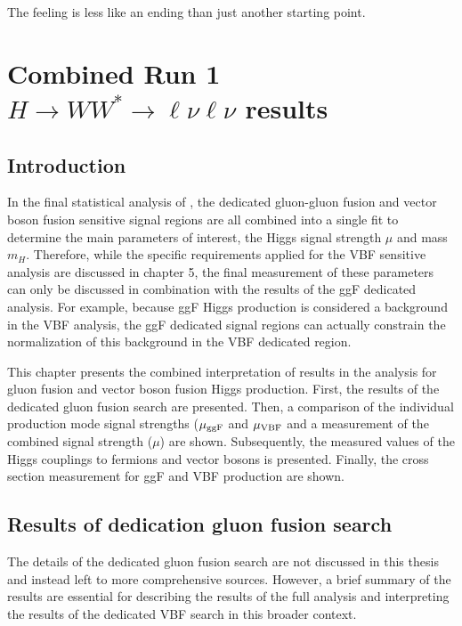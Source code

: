 \begin{savequote}[75mm]
The feeling is less like an ending than just another starting point.
\end{savequote}

\chapter{Combined Run 1 $H\rightarrow WW^{*}\rightarrow \ell\nu\ell\nu$ results}

\section{Introduction}

In the final statistical analysis of \HWWfull, the dedicated gluon-gluon fusion and vector boson fusion sensitive signal regions are all combined into a single fit to determine the main parameters of interest, the Higgs signal strength $\mu$ and mass $m_H$. Therefore, while the specific requirements applied for the VBF sensitive analysis are discussed in chapter 5, the final measurement of these parameters can only be discussed in combination with the results of the ggF dedicated analysis. For example, because ggF Higgs production is considered a background in the VBF analysis, the ggF dedicated signal regions can actually constrain the normalization of this background in the VBF dedicated region.

This chapter presents the combined interpretation of results in the \HWWfull analysis for gluon fusion and vector boson fusion Higgs production. First, the results of the dedicated gluon fusion search are presented. Then, a comparison of the individual production mode signal strengths ($\mu_{{\rm ggF}}$ and $\mu_{{\rm VBF}}$ and a measurement of the combined signal strength ($\mu$) are shown. Subsequently, the measured values of the Higgs couplings to fermions and vector bosons is presented. Finally, the cross section measurement for ggF and VBF production are shown. 

\section{Results of dedication gluon fusion \HWWfull search}

The details of the dedicated gluon fusion \HWWfull search are not discussed in this thesis and instead left to more comprehensive sources\cite{WW2015}. However, a brief summary of the results are essential for describing the results of the full analysis and interpreting the results of the dedicated VBF search in this broader context. 


